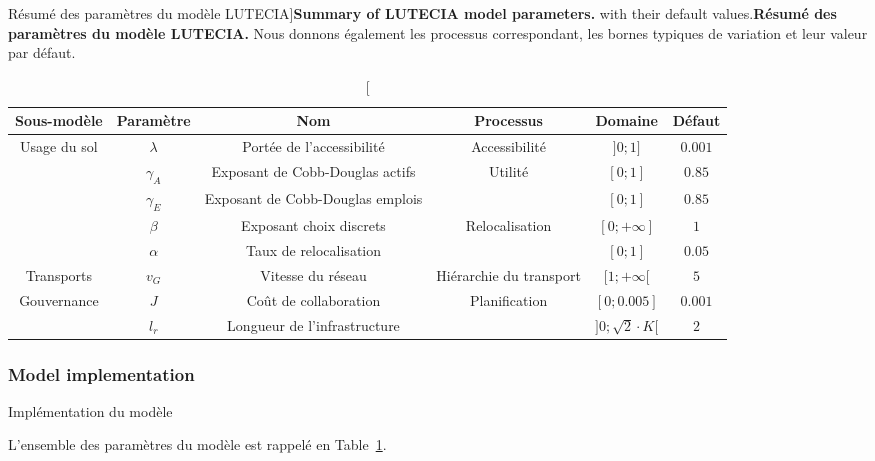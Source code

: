 \begin{table}
\caption[Summary of LUTECIA model parameters][Résumé des paramètres du modèle LUTECIA]{\textbf{Summary of LUTECIA model parameters.} with their default values.\label{tab:lutecia:parameters}}{\textbf{Résumé des paramètres du modèle LUTECIA.} Nous donnons également les processus correspondant, les bornes typiques de variation et leur valeur par défaut.\label{tab:lutecia:parameters}}
\begin{tabular}{|c|c|c|c|c|c|}
  \hline
 Sous-modèle & Paramètre & Nom & Processus & Domaine & Défaut\\
  \hline
\multirow{5}{*}{Usage du sol}& $\lambda$ & Portée de l'accessibilité & Accessibilité & $]0;1]$ & $0.001$ \\\cline{2-6}
 & $\gamma_A$ & Exposant de Cobb-Douglas actifs & \multirow{2}{*}{Utilité} & $[0;1]$ & $0.85$ \\\cline{2-3}\cline{5-6}
 & $\gamma_E$ & Exposant de Cobb-Douglas emplois &  & $[0;1]$ & $0.85$ \\\cline{2-6}
 & $\beta$ & Exposant choix discrets & \multirow{2}{*}{Relocalisation} & $[0;+\infty]$ & $1$ \\\cline{2-3}\cline{5-6}
 & $\alpha$ & Taux de relocalisation &  & $[0;1]$ & $0.05$ \\\hline
Transports & $v_G$ & Vitesse du réseau & Hiérarchie du transport & $[1;+\infty [$ & $5$ \\\hline
\multirow{2}{*}{Gouvernance} & $J$ & Coût de collaboration & \multirow{2}{*}{Planification} & $[0;0.005]$ & $0.001$ \\\cline{2-3}\cline{5-6}
 & $l_r$ & Longueur de l'infrastructure &  & $]0;\sqrt{2}\cdot K [$ & $2$ \\\hline
\end{tabular}
\end{table}





\subsubsection{Model implementation}{Implémentation du modèle}


L'ensemble des paramètres du modèle est rappelé en Table~\ref{tab:lutecia:parameters}.



